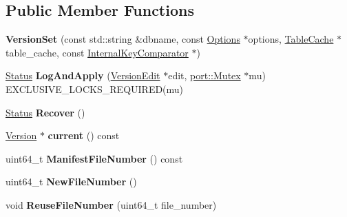 \subsection*{Public Member Functions}
\begin{DoxyCompactItemize}
\item 
\mbox{\label{classleveldb_1_1_version_set_a9e57cec002caced94f5355bb705bd52d}} 
{\bfseries Version\+Set} (const std\+::string \&dbname, const \mbox{\hyperlink{structleveldb_1_1_options}{Options}} $\ast$options, \mbox{\hyperlink{classleveldb_1_1_table_cache}{Table\+Cache}} $\ast$table\+\_\+cache, const \mbox{\hyperlink{classleveldb_1_1_internal_key_comparator}{Internal\+Key\+Comparator}} $\ast$)
\item 
\mbox{\label{classleveldb_1_1_version_set_ac1d014901be7095ace1aaec0cf391fb6}} 
\mbox{\hyperlink{classleveldb_1_1_status}{Status}} {\bfseries Log\+And\+Apply} (\mbox{\hyperlink{classleveldb_1_1_version_edit}{Version\+Edit}} $\ast$edit, \mbox{\hyperlink{classleveldb_1_1port_1_1_mutex}{port\+::\+Mutex}} $\ast$mu) E\+X\+C\+L\+U\+S\+I\+V\+E\+\_\+\+L\+O\+C\+K\+S\+\_\+\+R\+E\+Q\+U\+I\+R\+ED(mu)
\item 
\mbox{\label{classleveldb_1_1_version_set_a955ff8620ec56742cdc48da0e74ab40b}} 
\mbox{\hyperlink{classleveldb_1_1_status}{Status}} {\bfseries Recover} ()
\item 
\mbox{\label{classleveldb_1_1_version_set_a4e8359d3967464ca94ac007e9346f10d}} 
\mbox{\hyperlink{classleveldb_1_1_version}{Version}} $\ast$ {\bfseries current} () const
\item 
\mbox{\label{classleveldb_1_1_version_set_a208a57b4b28938ca0d8c8099d3c1f163}} 
uint64\+\_\+t {\bfseries Manifest\+File\+Number} () const
\item 
\mbox{\label{classleveldb_1_1_version_set_ac4086c848479e74c1d9eb95e250e7167}} 
uint64\+\_\+t {\bfseries New\+File\+Number} ()
\item 
\mbox{\label{classleveldb_1_1_version_set_a8131cebf5be3283e2ce1029e8be0d14e}} 
void {\bfseries Reuse\+File\+Number} (uint64\+\_\+t file\+\_\+number)

\end{DoxyCompactItemize}
